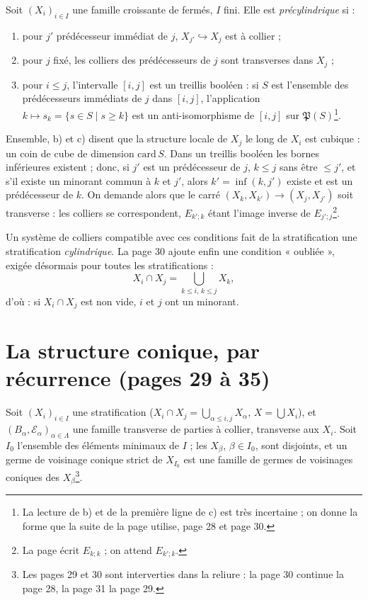 \documentclass[11pt,a4paper]{article}
\begin{document}
Soit $(X_i)_{i \in I}$ une famille croissante de fermés, $I$ fini. Elle est
\emph{précylindrique} si :
\begin{enumerate}
\item[a)] pour $j'$ prédécesseur immédiat de $j$, $X_{j'} \hookrightarrow X_j$ est
à collier ;
\item[b)] pour $j$ fixé, les colliers des prédécesseurs de $j$ sont transverses
dans $X_j$ ;
\item[c)] pour $i \leq j$, l'intervalle $[i, j]$ est un treillis booléen : si $S$
est l'ensemble des prédécesseurs immédiats de $j$ dans $[i,j]$, l'application
$k \mapsto s_k = \{ s \in S \mid s \geq k \}$ est un anti-isomorphisme de $[i,j]$ sur
$\mathfrak{P}(S)$\footnote{La lecture de b) et de la première ligne de c) est très
incertaine ; on donne la forme que la suite de la page utilise, page 28 et page
30.}.
\end{enumerate}
Ensemble, b) et c) disent que la structure locale de $X_j$ le long de $X_i$ est
cubique : un coin de cube de dimension $\mathrm{card}\, S$. Dans un treillis
booléen les bornes inférieures existent ; donc, si $j'$ est un prédécesseur de
$j$, $k \leq j$ sans être $\leq j'$, et s'il existe un minorant commun à $k$ et $j'$,
alors $k' = \inf(k, j')$ existe et est un prédécesseur de $k$. On demande alors
que le carré $(X_k, X_{k'}) \to (X_j, X_{j'})$ soit transverse : les colliers se
correspondent, $E_{k';k}$ étant l'image inverse de $E_{j';j}$\footnote{La page
écrit $E_{k;k}$ ; on attend $E_{k';k}$.}.

Un système de colliers compatible avec ces conditions fait de la stratification
une stratification \emph{cylindrique}. La page 30 ajoute enfin une condition
« oubliée », exigée désormais pour toutes les stratifications :
\[
X_i \cap X_j = \bigcup_{k \leq i,\, k \leq j} X_k ,
\]
d'où : si $X_i \cap X_j$ est non vide, $i$ et $j$ ont un minorant.

\section*{La structure conique, par récurrence (pages 29 à 35)}

Soit $(X_i)_{i \in I}$ une stratification ($X_i \cap X_j = \bigcup_{\alpha \leq i,j}
X_\alpha$, $X = \bigcup X_i$), et $(B_\alpha, \mathcal{E}_\alpha)_{\alpha \in
\Lambda}$ une famille transverse de parties à collier, transverse aux $X_i$. Soit
$I_0$ l'ensemble des éléments minimaux de $I$ ; les $X_\beta$, $\beta \in I_0$,
sont disjoints, et un germe de voisinage conique strict de $X_{I_0}$ est une famille
de germes de voisinages coniques des $X_\beta$\footnote{Les pages 29 et 30 sont
interverties dans la reliure : la page 30 continue la page 28, la page 31 la page
29.}.
\end{document}
